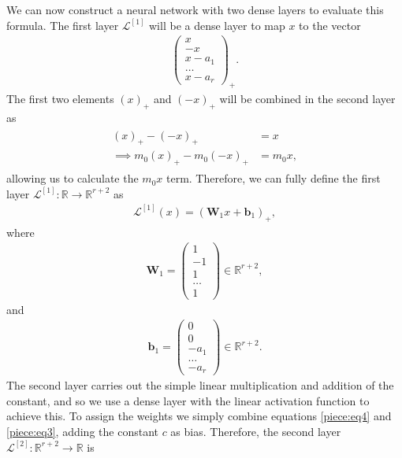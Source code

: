\documentclass{somasmsc}
\begin{document}
We can now construct a neural network with two dense layers to evaluate this formula. The first layer $\mathcal{L}^{\left[1\right]}$ will be a dense layer to map $x$ to the vector
\begin{align*}
\begin{pmatrix}
    x\ \\
    -x \\
    x - a_1 \\
    \dots \\
    x- a_r
\end{pmatrix}_+.
\end{align*}
The first two elements $\left(x\right)_+$ and $\left(-x\right)_+$ will be combined in the second layer as
\begin{align}\label{piece:eq4}
\begin{split}
\left(x\right)_+ - \left(-x\right)_+ &= x \\
\implies m_0 \left(x\right)_+ - m_0 \left(-x\right)_+ &= m_0 x,
\end{split}
\end{align}
allowing us to calculate the $m_0 x$ term. Therefore, we can fully define the first layer $\mathcal{L}^{\left[1\right]}: \mathbb{R} \rightarrow \mathbb{R}^{r+2}$ as
\begin{align*}
\mathcal{L}^{\left[1\right]}\left(x\right) = \left(\mathbf{W}_1 x + \pmb{b}_1\right)_+,
\end{align*}
where
\begin{align*}
\mathbf{W}_1 =
\begin{pmatrix}
    1 \\
    -1 \\
    1 \\
    \dots \\
    1
\end{pmatrix} \in \mathbb{R}^{r+2},
\end{align*}
and
\begin{align*}
\pmb{b}_1 =
\begin{pmatrix}
    0 \\
    0 \\
    -a_1 \\
    \dots \\
    -a_r
\end{pmatrix} \in \mathbb{R}^{r+2}.
\end{align*}
The second layer carries out the simple linear multiplication and addition of the constant, and so we use a dense layer with the linear activation function to achieve this. To assign the weights we simply combine equations \ref{piece:eq4} and \ref{piece:eq3}, adding the constant $c$ as bias. Therefore, the second layer $\mathcal{L}^{\left[2\right]}: \mathbb{R}^{r+2} \rightarrow \mathbb{R}$ is
\end{document}
